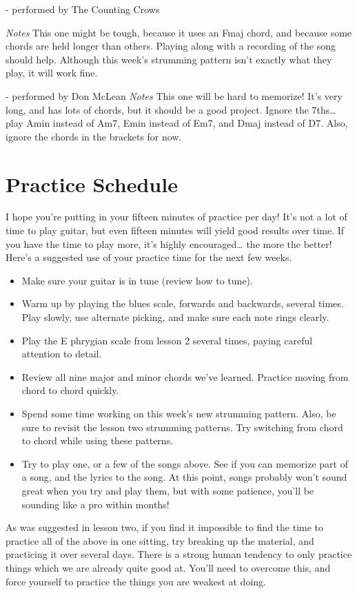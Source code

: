  - performed by The Counting Crows

\emph{Notes} This one might be tough, because it uses an Fmaj chord, and
because some chords are held longer than others. Playing along with a recording
of the song should help. Although this week's strumming pattern isn't exactly
what they play, it will work fine.

 - performed by Don McLean
\emph{Notes} This one will be hard to memorize! It's very long, and has lots of
chords, but it should be a good project. Ignore the 7ths\ldots{} play Amin
instead of Am7, Emin instead of Em7, and Dmaj instead of D7. Also, ignore the
chords in the brackets for now.

\section{Practice Schedule}
I hope you're putting in your fifteen minutes of practice per day! It's not a
lot of time to play guitar, but even fifteen minutes will yield good results
over time. If you have the time to play more, it's highly encouraged\ldots{} the
more the better! Here's a suggested use of your practice time for the next few
weeks.
%
\begin{itemize}
\item Make sure your guitar is in tune (review how to tune).
\item Warm up by playing the blues scale, forwards and backwards, several
      times. Play slowly, use alternate picking, and make sure each note rings
      clearly.
\item Play the E phrygian scale from lesson 2 several times, paying careful
      attention to detail.
\item Review all nine major and minor chords we've learned. Practice moving
      from chord to chord quickly.
\item Spend some time working on this week's new strumming pattern. Also, be
      sure to revisit the lesson two strumming patterns. Try switching from chord to
      chord while using these patterns.
\item Try to play one, or a few of the songs above. See if you can memorize
      part of a song, and the lyrics to the song. At this point, songs probably won't
      sound great when you try and play them, but with some patience, you'll be
      sounding like a pro within months! 
\end{itemize}
%
As was suggested in lesson two, if you find it impossible to find the time to
practice all of the above in one sitting, try breaking up the material, and
practicing it over several days. There is a strong human tendency to only
practice things which we are already quite good at. You'll need to overcome
this, and force yourself to practice the things you are weakest at doing.

